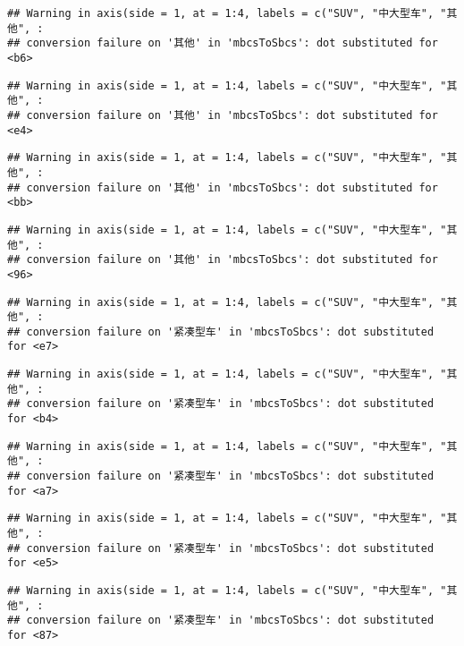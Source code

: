 \documentclass[]{article}
\begin{document}
\begin{verbatim}
## Warning in axis(side = 1, at = 1:4, labels = c("SUV", "中大型车", "其他", :
## conversion failure on '其他' in 'mbcsToSbcs': dot substituted for <b6>
\end{verbatim}

\begin{verbatim}
## Warning in axis(side = 1, at = 1:4, labels = c("SUV", "中大型车", "其他", :
## conversion failure on '其他' in 'mbcsToSbcs': dot substituted for <e4>
\end{verbatim}

\begin{verbatim}
## Warning in axis(side = 1, at = 1:4, labels = c("SUV", "中大型车", "其他", :
## conversion failure on '其他' in 'mbcsToSbcs': dot substituted for <bb>
\end{verbatim}

\begin{verbatim}
## Warning in axis(side = 1, at = 1:4, labels = c("SUV", "中大型车", "其他", :
## conversion failure on '其他' in 'mbcsToSbcs': dot substituted for <96>
\end{verbatim}

\begin{verbatim}
## Warning in axis(side = 1, at = 1:4, labels = c("SUV", "中大型车", "其他", :
## conversion failure on '紧凑型车' in 'mbcsToSbcs': dot substituted for <e7>
\end{verbatim}

\begin{verbatim}
## Warning in axis(side = 1, at = 1:4, labels = c("SUV", "中大型车", "其他", :
## conversion failure on '紧凑型车' in 'mbcsToSbcs': dot substituted for <b4>
\end{verbatim}

\begin{verbatim}
## Warning in axis(side = 1, at = 1:4, labels = c("SUV", "中大型车", "其他", :
## conversion failure on '紧凑型车' in 'mbcsToSbcs': dot substituted for <a7>
\end{verbatim}

\begin{verbatim}
## Warning in axis(side = 1, at = 1:4, labels = c("SUV", "中大型车", "其他", :
## conversion failure on '紧凑型车' in 'mbcsToSbcs': dot substituted for <e5>
\end{verbatim}

\begin{verbatim}
## Warning in axis(side = 1, at = 1:4, labels = c("SUV", "中大型车", "其他", :
## conversion failure on '紧凑型车' in 'mbcsToSbcs': dot substituted for <87>
\end{verbatim}
\end{document}
